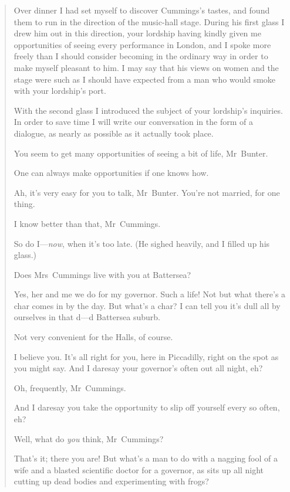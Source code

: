 \begin{quotation}
Over dinner I had set myself to discover Cummings's tastes, and found them to run in the direction of the music-hall stage. During his first glass I drew him out in this direction, your lordship having kindly given me opportunities of seeing every performance in London, and I spoke more freely than I should consider becoming in the ordinary way in order to make myself pleasant to him. I may say that his views on women and the stage were such as I should have expected from a man who would smoke with your lordship's port.

With the second glass I introduced the subject of your lordship's inquiries. In order to save time I will write our conversation in the form of a dialogue, as nearly as possible as it actually took place.

\begin{dialogue}
 You seem to get many opportunities of seeing a bit of life, Mr~Bunter.

 One can always make opportunities if one knows how.

 Ah, it's very easy for you to talk, Mr~Bunter. You're not married, for one thing.

 I know better than that, Mr~Cummings.

 So do I—\textit{now}, when it's too late. (He sighed heavily, and I filled up his glass.)

 Does Mrs~Cummings live with you at Battersea?

 Yes, her and me we do for my governor. Such a life! Not but what there's a char comes in by the day. But what's a char? I can tell you it's dull all by ourselves in that d—d Battersea suburb.

 Not very convenient for the Halls, of course.

 I believe you. It's all right for you, here in Piccadilly, right on the spot as you might say. And I daresay your governor's often out all night, eh?

 Oh, frequently, Mr~Cummings.

 And I daresay you take the opportunity to slip off yourself every so often, eh?

 Well, what do \textit{you} think, Mr~Cummings?

 That's it; there you are! But what's a man to do with a nagging fool of a wife and a blasted scientific doctor for a governor, as sits up all night cutting up dead bodies and experimenting with frogs?


\end{dialogue}
\end{quotation}
